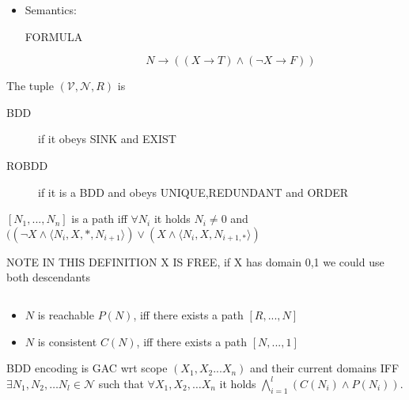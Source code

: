 \documentclass[10pt,twocolumn]{article}
\begin{document}
\begin{definition}
\begin{itemize}
\begin{description}
    \end{description}
\item Semantics: 
    \begin{description} 
        \item[FORMULA]
            \[
            N \rightarrow \left((X\rightarrow T)\wedge(\neg X\rightarrow F)\right)
            \]
    \end{description}
\end{itemize} 
\end{definition}

\begin{definition}
The tuple  $(\mathcal{V},\mathcal{N},R)$ is 
    \begin{description} 
        \item[BDD] if it obeys SINK and EXIST
        \item[ROBDD] if it is a BDD and obeys UNIQUE,REDUNDANT and ORDER
    \end{description}
\end{definition}


\begin{definition}
$[N_1,...,N_n]$ is a path iff $\forall N_i$ it holds $N_i \not = 0$ and $( 
(\neg X \wedge \langle N_i,X,\ast ,N_{i+1}\rangle) \vee (X \wedge \langle 
N_i,X,N_{i+1,\ast }\rangle )$
\end{definition}

NOTE IN THIS DEFINITION X IS FREE, if X has domain {0,1} we could use both 
descendants 

\begin{definition} $ $

\begin{itemize}
\item $N$ is reachable $P(N)$, iff there exists a path $[R,...,N]$
\item $N$ is consistent $C(N)$, iff there exists a path $[N,...,1]$
\end{itemize}
\end{definition}



\begin{definition}
BDD encoding is GAC wrt scope $(X_1,X_2...X_n)$ and their current domains IFF  
$\exists N_1,N_2,\ldots N_l \in \mathcal{N}$ such that $\forall X_1,X_2,\ldots 
X_n$ it holds $\bigwedge_{i=1}^l (C(N_i) \wedge P(N_i))$. 
\end{definition}
\end{document}
